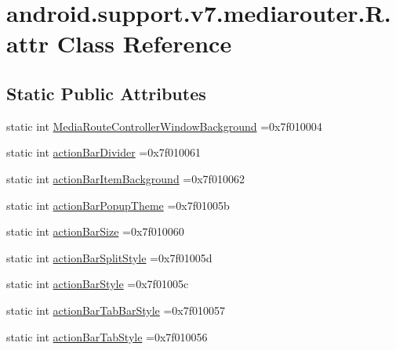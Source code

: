 \hypertarget{classandroid_1_1support_1_1v7_1_1mediarouter_1_1R_1_1attr}{}\section{android.\+support.\+v7.\+mediarouter.\+R.\+attr Class Reference}
\label{classandroid_1_1support_1_1v7_1_1mediarouter_1_1R_1_1attr}
\subsection*{Static Public Attributes}
\begin{DoxyCompactItemize}
\item 
static int \hyperlink{classandroid_1_1support_1_1v7_1_1mediarouter_1_1R_1_1attr_ae91bfe7681a9051ee4e4a442ff2bd9cb}{Media\+Route\+Controller\+Window\+Background} =0x7f010004
\item 
static int \hyperlink{classandroid_1_1support_1_1v7_1_1mediarouter_1_1R_1_1attr_a5f28c6cba7400ef345df849042e135b7}{action\+Bar\+Divider} =0x7f010061
\item 
static int \hyperlink{classandroid_1_1support_1_1v7_1_1mediarouter_1_1R_1_1attr_acf2d518fb015adaa3c6f71ae62af3d15}{action\+Bar\+Item\+Background} =0x7f010062
\item 
static int \hyperlink{classandroid_1_1support_1_1v7_1_1mediarouter_1_1R_1_1attr_abfb9b5bce455843ed1c8d5b58009669c}{action\+Bar\+Popup\+Theme} =0x7f01005b
\item 
static int \hyperlink{classandroid_1_1support_1_1v7_1_1mediarouter_1_1R_1_1attr_a56538f222ace8f340c54208e10527233}{action\+Bar\+Size} =0x7f010060
\item 
static int \hyperlink{classandroid_1_1support_1_1v7_1_1mediarouter_1_1R_1_1attr_a652ac3f04d2e8f20aeb339269b0aa8ea}{action\+Bar\+Split\+Style} =0x7f01005d
\item 
static int \hyperlink{classandroid_1_1support_1_1v7_1_1mediarouter_1_1R_1_1attr_a3fa85b39fafd6ebfd535c95c2ba0a633}{action\+Bar\+Style} =0x7f01005c
\item 
static int \hyperlink{classandroid_1_1support_1_1v7_1_1mediarouter_1_1R_1_1attr_a40306e1def683ac3a79c6cee5eac1e11}{action\+Bar\+Tab\+Bar\+Style} =0x7f010057
\item 
static int \hyperlink{classandroid_1_1support_1_1v7_1_1mediarouter_1_1R_1_1attr_a092c66e5f0954d506b706e77e70ed366}{action\+Bar\+Tab\+Style} =0x7f010056
\item 

\end{DoxyCompactItemize}

